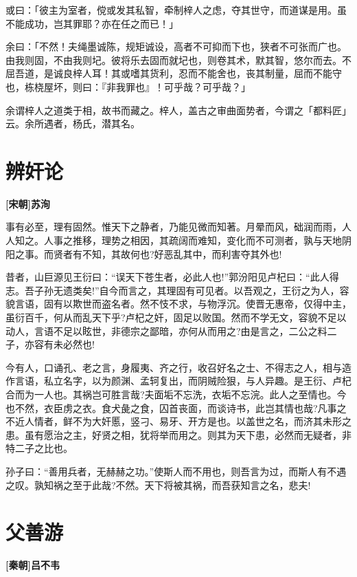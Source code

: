 \documentclass[UTF8,titlepage,oneside]{ctexbook}
\begin{document}
或曰：「彼主为室者，傥或发其私智，牵制梓人之虑，夺其世守，而道谋是用。虽不能成功，岂其罪耶？亦在任之而已！」

余曰：「不然！夫绳墨诚陈，规矩诚设，高者不可抑而下也，狭者不可张而广也。由我则固，不由我则圮。彼将乐去固而就圮也，则卷其术，默其智，悠尔而去。不屈吾道，是诚良梓人耳！其或嗜其货利，忍而不能舍也，丧其制量，屈而不能守也，栋桡屋坏，则曰：『非我罪也』！可乎哉？可乎哉？」

余谓梓人之道类于相，故书而藏之。梓人，盖古之审曲面势者，今谓之「都料匠」云。余所遇者，杨氏，潜其名。

\chapter*{辨奸论}
\begin{center}
	\textbf{[宋朝]苏洵}
\end{center}


事有必至，理有固然。惟天下之静者，乃能见微而知著。月晕而风，础润而雨，人人知之。人事之推移，理势之相因，其疏阔而难知，变化而不可测者，孰与天地阴阳之事。而贤者有不知，其故何也?好恶乱其中，而利害夺其外也!


昔者，山巨源见王衍曰：“误天下苍生者，必此人也!”郭汾阳见卢杞曰：“此人得志。吾子孙无遗类矣!”自今而言之，其理固有可见者。以吾观之，王衍之为人，容貌言语，固有以欺世而盗名者。然不忮不求，与物浮沉。使晋无惠帝，仅得中主，虽衍百千，何从而乱天下乎?卢杞之奸，固足以败国。然而不学无文，容貌不足以动人，言语不足以眩世，非德宗之鄙暗，亦何从而用之?由是言之，二公之料二子，亦容有未必然也!


今有人，口诵孔、老之言，身履夷、齐之行，收召好名之士、不得志之人，相与造作言语，私立名字，以为颜渊、孟轲复出，而阴贼险狠，与人异趣。是王衍、卢杞合而为一人也。其祸岂可胜言哉?夫面垢不忘洗，衣垢不忘浣。此人之至情也。今也不然，衣臣虏之衣。食犬彘之食，囚首丧面，而谈诗书，此岂其情也哉?凡事之不近人情者，鲜不为大奸慝，竖刁、易牙、开方是也。以盖世之名，而济其未形之患。虽有愿治之主，好贤之相，犹将举而用之。则其为天下患，必然而无疑者，非特二子之比也。


孙子曰：“善用兵者，无赫赫之功。”使斯人而不用也，则吾言为过，而斯人有不遇之叹。孰知祸之至于此哉?不然。天下将被其祸，而吾获知言之名，悲夫!



\chapter*{父善游}
\begin{center}
	\textbf{[秦朝]吕不韦}
\end{center}
\end{document}
